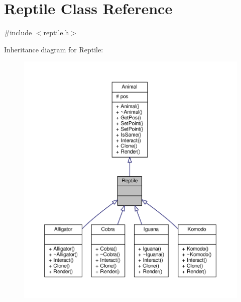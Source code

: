 \hypertarget{classReptile}{}\section{Reptile Class Reference}
\label{classReptile}


{\ttfamily \#include $<$reptile.\+h$>$}



Inheritance diagram for Reptile\+:
\nopagebreak
\begin{figure}[H]
\begin{center}
\leavevmode
\includegraphics[width=350pt]{classReptile__inherit__graph}
\end{center}
\end{figure}


